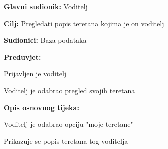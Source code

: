 				\noindent {}
				\begin{packed_item}
					
					\item \textbf{Glavni sudionik: } Voditelj
					\item  \textbf{Cilj:} Pregledati popis teretana kojima je on voditelj
					\item  \textbf{Sudionici:} Baza podataka
					\item  \textbf{Preduvjet:}
					\item[] \begin{packed_enum}
						
						\item Prijavljen je voditelj
						\item Voditelj je odabrao pregled svojih teretana
						
					\end{packed_enum}
					\item  \textbf{Opis osnovnog tijeka:}
					
					\item[] \begin{packed_enum}
						
						\item Voditelj  je odabrao opciju "moje teretane"
						\item Prikazuje se popis teretana tog voditelja
					\end{packed_enum}
					
					
				\end{packed_item}
				
